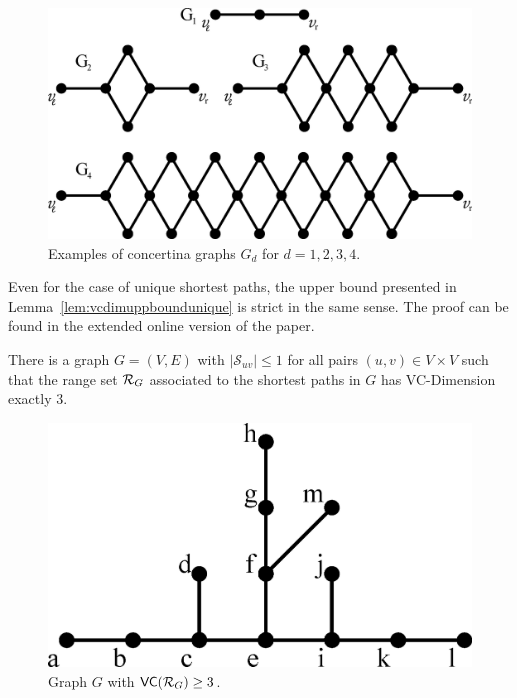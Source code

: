 \begin{figure}[th]
  \centering
  \includegraphics[scale=0.3]{tight}
  \caption{Examples of concertina graphs $G_d$ for $d=1,2,3,4$.}
  \label{fig:tightgraphs}
\end{figure}

Even for the case of unique shortest paths, the upper bound presented in
Lemma~\ref{lem:vcdimuppboundunique} is strict in the same sense.
\ifproof
\else
The proof can be found in the extended online version of the paper.
\fi

\begin{lemma}\label{lem:vcdimlowboundunique}
  There is a graph $G=(V,E)$ with $|\mathcal{S}_{uv}|\le1$ for all
  pairs $(u,v)\in V\times V$ such that the range set $\mathcal{R}_G$ associated to the
  shortest paths in $G$ has VC-Dimension exactly $3$.
\end{lemma}

\ifproof
\begin{figure}[ht]
  \centering
  \includegraphics[scale=0.35]{uniqueshortestpathtight}
  \caption{Graph $G$ with $\mathsf{VC}(\mathcal{R}_G)\ge 3$.}
  \label{fig:uniquetight}
\end{figure}


